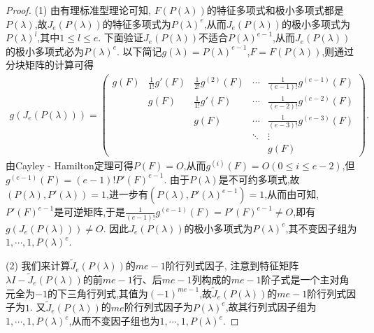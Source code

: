 \documentclass[../../main.tex]{subfiles}
\begin{document}
\begin{proof}
(1) 由有理标准型理论可知, $F(P(\lambda))$的特征多项式和极小多项式都是$P(\lambda)$,故$J_e(P(\lambda))$的特征多项式为$P(\lambda)^e$,从而$J_e(P(\lambda))$的极小多项式为$P(\lambda)^l$,其中$1\leqslant l\leqslant e$. 下面验证$J_e(P(\lambda))$不适合$P(\lambda)^{e - 1}$,从而$J_e(P(\lambda))$的极小多项式必为$P(\lambda)^e$. 以下简记$g(\lambda)=P(\lambda)^{e - 1}$,$F = F(P(\lambda))$,则通过分块矩阵的计算可得
\begin{align*}
g(J_e(P(\lambda))) = 
\begin{pmatrix}
g(F) & \frac{1}{1!}g'(F) & \frac{1}{2!}g^{(2)}(F) & \cdots & \frac{1}{(e - 1)!}g^{(e - 1)}(F) \\
 & g(F) & \frac{1}{1!}g'(F) & \cdots & \frac{1}{(e - 2)!}g^{(e - 2)}(F) \\
 & & g(F) & \cdots & \frac{1}{(e - 3)!}g^{(e - 3)}(F) \\
 & & & \ddots & \vdots \\
 & & & & g(F)
\end{pmatrix}.
\end{align*}
由Cayley - Hamilton定理可得$P(F)=O$,从而$g^{(i)}(F)=O (0\leqslant i\leqslant e - 2)$,但$g^{(e - 1)}(F)=(e - 1)!P'(F)^{e - 1}$. 由于$P(\lambda)$是不可约多项式,故$(P(\lambda),P'(\lambda)) = 1$,进一步有$(P(\lambda),P'(\lambda)^{e - 1}) = 1$,从而由可知,$P'(F)^{e - 1}$是可逆矩阵,于是$\frac{1}{(e - 1)!}g^{(e - 1)}(F)=P'(F)^{e - 1}\neq O$,即有$g(J_e(P(\lambda)))\neq O$. 因此$J_e(P(\lambda))$的极小多项式为$P(\lambda)^e$,其不变因子组为$1,\cdots,1,P(\lambda)^e$.

(2) 我们来计算$\widetilde{J}_e(P(\lambda))$的$me - 1$阶行列式因子, 注意到特征矩阵$\lambda I-\widetilde{J}_e(P(\lambda))$的前$me - 1$行、后$me - 1$列构成的$me - 1$阶子式是一个主对角元全为$-1$的下三角行列式,其值为$(-1)^{me - 1}$,故$\widetilde{J}_e(P(\lambda))$的$me - 1$阶行列式因子为$1$. 又$\widetilde{J}_e(P(\lambda))$的$me$阶行列式因子为$P(\lambda)^e$,故其行列式因子组为$1,\cdots,1,P(\lambda)^e$,从而不变因子组也为$1,\cdots,1,P(\lambda)^e$.
\end{proof}
\end{document}
